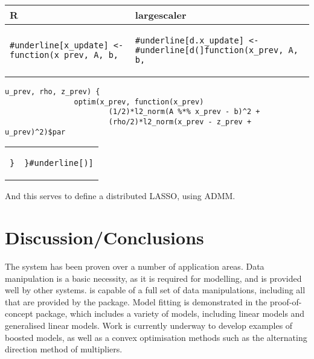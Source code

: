 \documentclass[letterpaper, inpress]{jds} %
\begin{document}
\begin{table}[H]
\centering
\begin{tabular}{p{} | p{}}
R & largescaler \\ \midrule
\begin{Verbatim}[commandchars=\#\[\]]
#underline[x_update] <- function(x_prev, A, b,
\end{Verbatim}
& 
\begin{Verbatim}[commandchars=\#\[\]]
#underline[d.x_update] <- #underline[d(]function(x_prev, A, b,
\end{Verbatim}
\end{tabular}
\begin{Verbatim}[commandchars=\#\[\]]
                     u_prev, rho, z_prev) {
                optim(x_prev, function(x_prev)
                        (1/2)*l2_norm(A %*% x_prev - b)^2 +
                        (rho/2)*l2_norm(x_prev - z_prev + u_prev)^2)$par
\end{Verbatim}
\begin{tabular}{p{} | p{}}
\begin{Verbatim}[commandchars=\#\[\]]
                 }
\end{Verbatim}
&
\begin{Verbatim}[commandchars=\#\[\]]
                 }#underline[)]
\end{Verbatim}
\\
\end{tabular}
\end{table}

And this serves to define a distributed LASSO, using ADMM.
                    
\section{Discussion/Conclusions}

The  system has been proven over a number of application areas.
Data manipulation is a basic necessity, as it is required for modelling, and is provided well by other systems.
 is capable of a full set of data manipulations, including all that are provided by the  package.
Model fitting is demonstrated in the proof-of-concept  package, which includes a variety of models, including linear models and generalised linear models.
Work is currently underway to develop examples of boosted models, as well as a convex optimisation methods such as the alternating direction method of multipliers.
\end{document}
